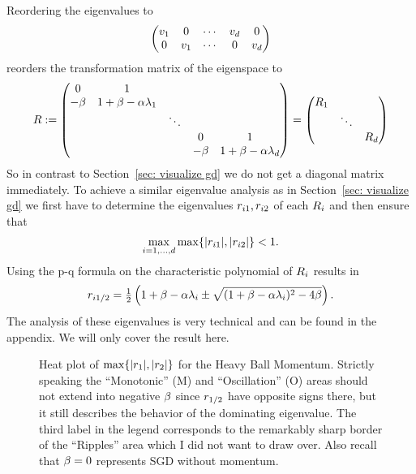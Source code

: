 %
Reordering the eigenvalues to
%
\begin{align*}
	\begin{pmatrix}
		v_1 & 0 & \cdots & v_d & 0 \\
		0 & v_1 & \cdots & 0 & v_d
	\end{pmatrix}
\end{align*}
%
reorders the transformation matrix of the eigenspace to
%
\begin{align}\label{eq: eigenspace momentum transformation}
	R := \begin{pmatrix}
		0 & 1 \\
		-\beta & 1+\beta - \alpha\lambda_1 & \\
		& & \ddots & \\
		& & & 0 & 1 \\
		& & & -\beta & 1+\beta - \alpha\lambda_d \\
	\end{pmatrix}
	= \begin{pmatrix}
		R_1 \\
		& \ddots\\
		&& R_d
	\end{pmatrix}
\end{align}
%
So in contrast to Section~\ref{sec: visualize gd} we do not get a diagonal
matrix immediately. To achieve a similar eigenvalue analysis as in
Section~\ref{sec: visualize gd} we first have to determine the eigenvalues
\(r_{i1},r_{i2}\) of each \(R_i\) and then ensure that
\begin{align}
	\max_{i=1,\dots, d} \max\{|r_{i1}|,|r_{i2}|\} < 1.
\end{align}
Using the p-q formula on the characteristic polynomial of \(R_i\)
results in 
\begin{align*}
	r_{i1/2}
	= \tfrac12 \left(
		1+\beta-\alpha\lambda_i
		\pm \sqrt{(1+\beta-\alpha\lambda_i)^2 - 4\beta}
	\right).
\end{align*}
%
The analysis of these eigenvalues is very technical and can be found in the
appendix. We will only cover the result here.

\begin{figure}[h]
	\centering
	\def\svgwidth{1\textwidth}
	
	\caption{
		Heat plot of \(\max\{|r_1|,|r_2|\}\) for the Heavy Ball Momentum.
		Strictly speaking the ``Monotonic'' (M) and ``Oscillation'' (O) areas should not
		extend into negative \(\beta\) since \(r_{1/2}\)
		have opposite signs there, but it still describes the behavior of the
		dominating eigenvalue. The third label in the legend corresponds to the
		remarkably sharp border of the ``Ripples'' area which I did not want to
		draw over. Also recall that \(\beta=0\) represents SGD
		without momentum.
	}
	\label{fig: annotated heavy ball rates}
\end{figure}

